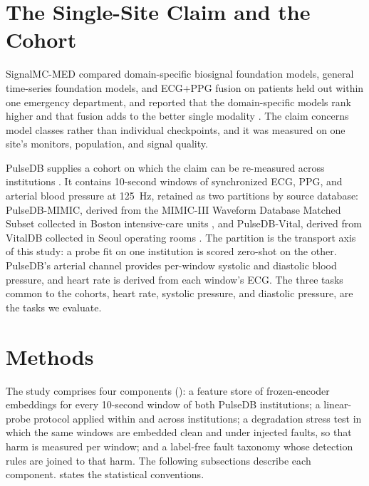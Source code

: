 \documentclass[pmlr,twocolumn,10pt]{jmlr}
\begin{document}
\section{The Single-Site Claim and the Cohort}
\label{sec:claim}

SignalMC-MED compared domain-specific biosignal foundation models, general time-series foundation models, and ECG+PPG fusion on patients held out within one emergency department, and reported that the domain-specific models rank higher and that fusion adds to the better single modality \citep{signalmcmed}. The claim concerns model classes rather than individual checkpoints, and it was measured on one site's monitors, population, and signal quality.

PulseDB supplies a cohort on which the claim can be re-measured across institutions \citep{wang2023pulsedb}. It contains 10-second windows of synchronized ECG, PPG, and arterial blood pressure at \SI{125}{\hertz}, retained as two partitions by source database: PulseDB-MIMIC, derived from the MIMIC-III Waveform Database Matched Subset collected in Boston intensive-care units \citep{johnson2016mimic}, and PulseDB-Vital, derived from VitalDB collected in Seoul operating rooms \citep{lee2022vitaldb}. The partition is the transport axis of this study: a probe fit on one institution is scored zero-shot on the other. PulseDB's arterial channel provides per-window systolic and diastolic blood pressure, and heart rate is derived from each window's ECG. The three tasks common to the cohorts, heart rate, systolic pressure, and diastolic pressure, are the tasks we evaluate.

\section{Methods}
\label{sec:methods}

The study comprises four components (): a feature store of frozen-encoder embeddings for every 10-second window of both PulseDB institutions; a linear-probe protocol applied within and across institutions; a degradation stress test in which the same windows are embedded clean and under injected faults, so that harm is measured per window; and a label-free fault taxonomy whose detection rules are joined to that harm. The following subsections describe each component.  states the statistical conventions.
\end{document}
